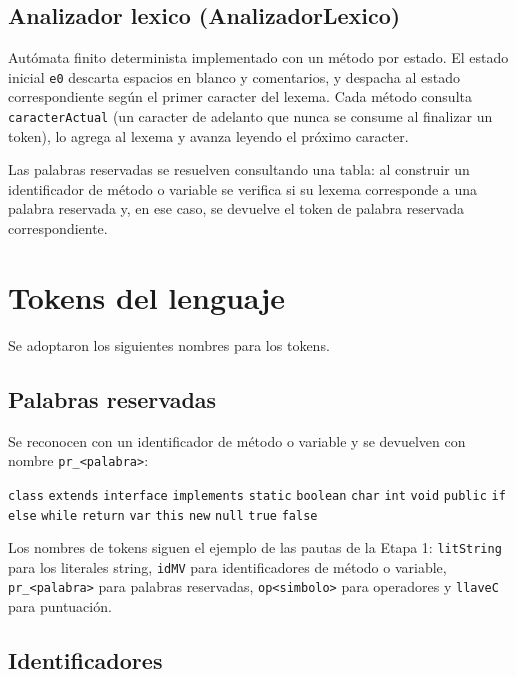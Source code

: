\documentclass[11pt,a4paper]{article}
\begin{document}
\subsection{Analizador lexico (AnalizadorLexico)}

Autómata finito determinista implementado con un método por estado. El estado inicial
\texttt{e0} descarta espacios en blanco y comentarios, y despacha al estado correspondiente
según el primer caracter del lexema. Cada método consulta \texttt{caracterActual} (un caracter
de adelanto que nunca se consume al finalizar un token), lo agrega al lexema y avanza
leyendo el próximo caracter.

Las palabras reservadas se resuelven consultando una tabla: al construir un identificador
de método o variable se verifica si su lexema corresponde a una palabra reservada y, en
ese caso, se devuelve el token de palabra reservada correspondiente.

\section{Tokens del lenguaje}

Se adoptaron los siguientes nombres para los tokens.

\subsection{Palabras reservadas}

Se reconocen con un identificador de método o variable y se devuelven con nombre
\verb!pr_<palabra>!:

\noindent
\texttt{class} \texttt{extends} \texttt{interface} \texttt{implements} \texttt{static}
\texttt{boolean} \texttt{char} \texttt{int} \texttt{void}
\texttt{public} \texttt{if} \texttt{else} \texttt{while} \texttt{return} \texttt{var}
\texttt{this} \texttt{new} \texttt{null} \texttt{true} \texttt{false}

\medskip
\noindent
Los nombres de tokens siguen el ejemplo de las pautas de la Etapa 1: \texttt{litString}
para los literales string, \texttt{idMV} para identificadores de método o variable,
\verb!pr_<palabra>! para palabras reservadas, \texttt{op<simbolo>} para operadores y
\texttt{llaveC} para puntuación.

\subsection{Identificadores}
\end{document}
